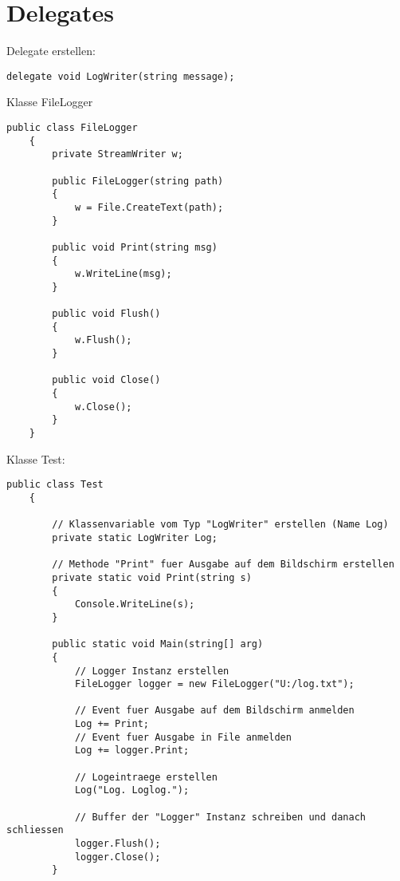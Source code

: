 \newpage
\section{Delegates}
Delegate erstellen:
\begin{lstlisting}[style=Csharp]
	 delegate void LogWriter(string message);
\end{lstlisting}

Klasse FileLogger 
\begin{lstlisting}[style=Csharp]
    public class FileLogger
    {
        private StreamWriter w;

        public FileLogger(string path)
        {
            w = File.CreateText(path);
        }

        public void Print(string msg)
        {
            w.WriteLine(msg);
        }

        public void Flush()
        {
            w.Flush();
        }

        public void Close()
        {
            w.Close();
        }
    }
\end{lstlisting}

Klasse Test:
\begin{lstlisting}[style=Csharp]
	public class Test
	{

	    // Klassenvariable vom Typ "LogWriter" erstellen (Name Log)
	    private static LogWriter Log;
	
	    // Methode "Print" fuer Ausgabe auf dem Bildschirm erstellen
	    private static void Print(string s)
	    {
	        Console.WriteLine(s);
	    }
	
	    public static void Main(string[] arg)
	    {
	        // Logger Instanz erstellen
	        FileLogger logger = new FileLogger("U:/log.txt");
	
	        // Event fuer Ausgabe auf dem Bildschirm anmelden
	        Log += Print;
	        // Event fuer Ausgabe in File anmelden
	        Log += logger.Print; 
	
	        // Logeintraege erstellen
	        Log("Log. Loglog.");
	
	        // Buffer der "Logger" Instanz schreiben und danach schliessen
	        logger.Flush();
	        logger.Close();
	    }
 \end{lstlisting}